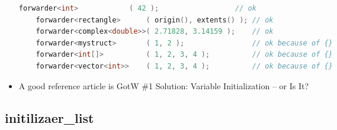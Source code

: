 \documentclass[a4paper,12pt,twoside]{book}
\begin{document}
\begin{itemize}
\begin{lstlisting}[frame=single, language=c++,mathescape=true]
	forwarder<int>            ( 42 );                  // ok
	forwarder<rectangle>      ( origin(), extents() ); // ok
	forwarder<complex<double>>( 2.71828, 3.14159 );    // ok
	forwarder<mystruct>       ( 1, 2 );                // ok because of {}
	forwarder<int[]>          ( 1, 2, 3, 4 );          // ok because of {}
	forwarder<vector<int>>    ( 1, 2, 3, 4 );          // ok because of {}
	\end{lstlisting}
	
	\item A good reference article is GotW \#1 Solution: Variable Initialization – or Is It?
\end{itemize}

\subsection{initilizaer\_list}
\end{document}
